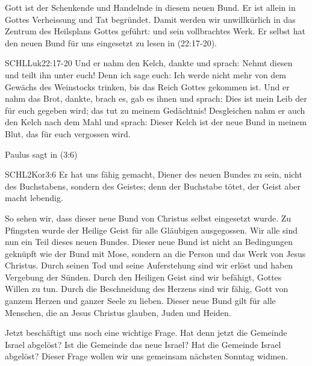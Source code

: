     \begin{otsblock}
        Gott ist der Schenkende und Handelnde in diesem neuen Bund. Er ist allein in Gottes Verheissung und Tat begründet. Damit werden wir unwillkürlich in das Zentrum des Heilsplans Gottes geführt:  und sein vollbrachtes Werk. Er selbst hat den neuen Bund für uns eingesetzt zu lesen in (22:17-20).
        \begin{bibelbox}{SCHL}{Luk}{22:17-20}
            Und er nahm den Kelch, dankte und sprach: Nehmt diesen und teilt ihn unter euch! Denn ich sage euch: Ich werde nicht mehr von dem Gewächs des Weinstocks trinken, bis das Reich Gottes gekommen ist. Und er nahm das Brot, dankte, brach es, gab es ihnen und sprach: Dies ist mein Leib der für euch gegeben wird; das tut zu meinem Gedächtnis! Desgleichen nahm er auch den Kelch nach dem Mahl und sprach: Dieser Kelch ist der neue Bund in meinem Blut, das für euch vergossen wird.
        \end{bibelbox}
        Paulus sagt in (3:6)
        \begin{bibelbox}{SCHL}{2Kor}{3:6}
            Er hat uns fähig gemacht, Diener des neuen Bundes zu sein, nicht des Buchstabens, sondern des Geistes; denn der Buchstabe tötet, der Geist aber macht lebendig.
        \end{bibelbox}
        So sehen wir, dass dieser neue Bund von Christus selbst eingesetzt wurde. Zu Pfingsten wurde der Heilige Geist für alle Gläubigen ausgegossen. Wir alle sind nun ein Teil dieses neuen Bundes. Dieser neue Bund ist nicht an Bedingungen geknüpft wie der Bund mit Mose, sondern an die Person und das Werk von Jesus Christus. Durch seinen Tod und seine Auferstehung sind wir erlöst und haben Vergebung der Sünden. Durch den Heiligen Geist sind wir befähigt, Gottes Willen zu tun. Durch die Beschneidung des Herzens sind wir fähig, Gott von ganzem Herzen und ganzer Seele zu lieben. Dieser neue Bund gilt für alle Menschen, die an Jesus Christus glauben, Juden und Heiden.

        Jetzt beschäftigt uns noch eine wichtige Frage. Hat denn jetzt die Gemeinde Israel abgelöst? Ist die Gemeinde das neue Israel?  Hat die Gemeinde Israel abgelöst? Dieser Frage wollen wir uns gemeinsam nächsten Sonntag widmen. 
    \end{otsblock}    